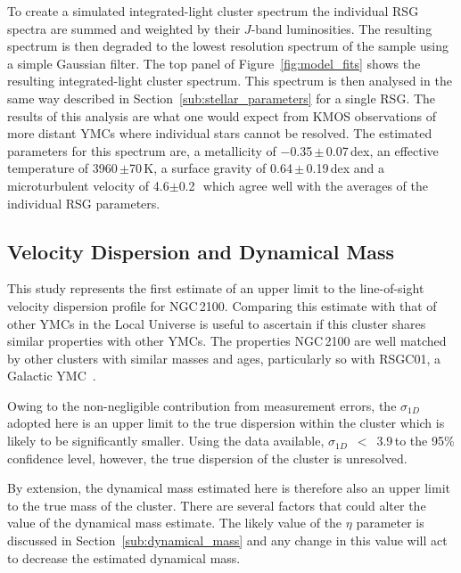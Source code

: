 To create a simulated integrated-light cluster spectrum the individual RSG spectra are summed and weighted by their $J$-band luminosities.
The resulting spectrum is then degraded to the lowest resolution spectrum of the sample using a simple Gaussian filter.
The top panel of Figure~\ref{fig:model_fits} shows the resulting integrated-light cluster spectrum.
This spectrum is then analysed in the same way described in Section~\ref{sub:stellar_parameters} for a single RSG.
The results of this analysis are what one would expect from KMOS observations of more distant YMCs where individual stars cannot be resolved.
The estimated parameters for this spectrum are, a metallicity of $-$0.35\,$\pm$\,0.07\,dex, an effective temperature of 3960\,$\pm$70\,K,
a surface gravity of 0.64\,$\pm$\,0.19\,dex and a microturbulent velocity of 4.6$\pm$0.2\,\kms~which agree well with the averages of the individual RSG parameters.


\subsection{Velocity Dispersion and Dynamical Mass} %
\label{sub:velocity_dispersion_Mdyn}

This study represents the first estimate of an upper limit to the line-of-sight velocity dispersion profile for NGC\,2100.
Comparing this estimate with that of other YMCs in the Local Universe is useful to ascertain if this cluster shares similar properties with other YMCs.
The properties NGC\,2100 are well matched by other clusters with similar masses and ages, particularly so with RSGC01, a Galactic YMC~\citep{2007ApJ...671..781D}.

Owing to the non-negligible contribution from measurement errors, the $\sigma_{1D}$ adopted here is an upper limit to the true dispersion within the cluster which is likely to be significantly smaller.
Using the data available, $\sigma_{1D}$~$<$~3.9\,\kms to the 95\% confidence level, however,
the true dispersion of the cluster is unresolved.

By extension, the dynamical mass estimated here is therefore also an upper limit to the true mass of the cluster.
There are several factors that could alter the value of the dynamical mass estimate.
The likely value of the $\eta$ parameter is discussed in Section~\ref{sub:dynamical_mass} and any change in this value will act to decrease the estimated dynamical mass.

